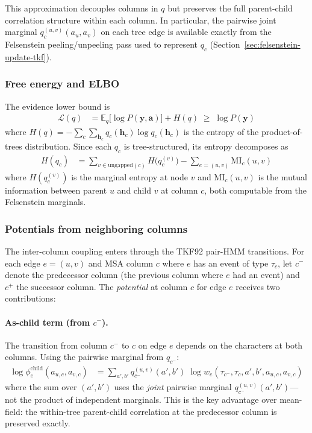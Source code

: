 This approximation decouples columns in $q$ but preserves the
full parent-child correlation structure within each column.
In particular, the pairwise joint marginal
$q_c^{(u,v)}(a_u, a_v)$ on each tree edge is available exactly from
the Felsenstein peeling/unpeeling pass used to represent $q_c$
(Section~\ref{sec:felsenstein-update-tkf}).

\subsubsection{Free energy and ELBO}

The evidence lower bound is
\begin{align}
\mathcal{L}(q) &= \mathbb{E}_q\bigl[\log P(\mathbf{y}, \mathbf{a})\bigr] + H(q)
  \;\geq\; \log P(\mathbf{y})
\label{eq:elbo-tkf}
\end{align}
where $H(q) = -\sum_c \sum_{\mathbf{h}_c} q_c(\mathbf{h}_c) \log q_c(\mathbf{h}_c)$
is the entropy of the product-of-trees distribution.
Since each $q_c$ is tree-structured, its entropy decomposes as
\begin{align}
H(q_c) &= \sum_{v \in \mathrm{ungapped}(c)} H\!\bigl(q_c^{(v)}\bigr)
  - \sum_{e = (u,v)} \mathrm{MI}_c(u, v)
\label{eq:tree-entropy-tkf}
\end{align}
where $H(q_c^{(v)})$ is the marginal entropy at node $v$ and
$\mathrm{MI}_c(u,v)$ is the mutual information between parent $u$ and child $v$
at column $c$, both computable from the Felsenstein marginals.

\subsubsection{Potentials from neighboring columns}

The inter-column coupling enters through the TKF92 pair-HMM transitions.
For each edge $e = (u,v)$ and MSA column $c$ where $e$ has an event of type $\tau_c$,
let $c^-$ denote the predecessor column (the previous column where $e$ had an event)
and $c^+$ the successor column.
The \emph{potential} at column $c$ for edge $e$ receives two contributions:

\paragraph{As-child term (from $c^-$).}
The transition from column $c^-$ to $c$ on edge $e$ depends on the
characters at both columns. Using the pairwise marginal from $q_{c^-}$:
\begin{align}
\log \phi_e^{\mathrm{child}}(a_{u,c}, a_{v,c})
 &= \sum_{a', b'} q_{c^-}^{(u,v)}(a', b')\;
    \log w_e(\tau_{c^-\!}, \tau_c, a', b', a_{u,c}, a_{v,c})
\label{eq:pot-child-tkf}
\end{align}
where the sum over $(a', b')$ uses the \emph{joint} pairwise marginal
$q_{c^-}^{(u,v)}(a', b')$---not the product of independent marginals.
This is the key advantage over mean-field:
the within-tree parent-child correlation at the predecessor column is
preserved exactly.

